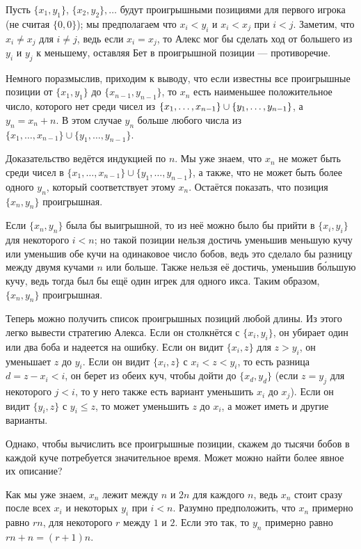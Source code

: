 Пусть $\{x_1 , y_1\}$, $\{x_2 , y_2\},\dots$ будут проигрышными позициями для первого игрока (не считая $\{0, 0\}$);
мы предполагаем что $x_i < y_i$ и $x_i < x_j$ при $i < j$.
Заметим, что $x_i \ne x_j$ для $i \ne j$, ведь если $x_i = x_j$, то Алекс мог бы сделать ход от большего из $y_i$ и $y_j$ к меньшему, оставляя Бет в проигрышной позиции --- противоречие.

Немного поразмыслив, приходим к выводу, что если известны все проигрышные позиции от $\{x_1 , y_1\}$ до $\{x_{n-1}, y_{n-1}\}$, то $x_n$ есть наименьшее положительное число, которого нет среди чисел из $\{x_1, \dots , x_{n-1}\} \z\cup \{y_1, \dots , y_{n-1}\}$, а $y_n = x_n + n$.
В этом случае $y_n$ больше любого числа из $\{x_1, \dots , x_{n-1}\} \cup \{y_1, \dots , y_{n-1}\}$.

Доказательство ведётся индукцией по $n$.
Мы уже знаем, что $x_n$ не может быть среди чисел в $\{x_1, \dots , x_{n-1}\} \cup \{y_1, \dots , y_{n-1}\}$, а также, что не может быть более одного $y_n$, который соответствует этому $x_n$.
Остаётся показать, что позиция $\{x_n, y_n\}$ проигрышная.

Если $\{x_n, y_n\}$ была бы выигрышной, то из неё можно было бы прийти в $\{x_i, y_i\}$ для некоторого $i < n$; но такой позиции нельзя достичь уменьшив меньшую кучу или уменьшив обе кучи на одинаковое число бобов, ведь это сделало бы разницу между двумя кучами $n$ или больше.
Также нельзя её достичь, уменьшив б\'{о}льшую кучу, ведь тогда был бы ещё один игрек для одного икса.
Таким образом, $\{x_n, y_n\}$ проигрышная.

Теперь можно получить список проигрышных позиций любой длины.
Из этого легко вывести стратегию Алекса.
Если он столкнётся с $\{x_i , y_i\}$, он убирает один или два боба и надеется на ошибку.
Если он видит $\{x_i , z\}$ для $z > y_i$, он уменьшает $z$ до $y_i$.
Если он видит $\{x_i , z\}$ с $x_i < z < y_i$, то есть разница $d = z - x_i < i$, он берет из обеих куч, чтобы дойти до $\{x_d , y_d\}$ (если $z = y_j$ для некоторого $j < i$, то у него также есть вариант уменьшить $x_i$ до $x_j$).
Если он видит $\{y_i , z\}$ с $y_i \le z$, то может уменьшить $z$ до $x_i$, а может иметь и другие варианты.


Однако, чтобы вычислить все проигрышные позиции, скажем до тысячи бобов в каждой куче потребуется значительное время.
Может можно найти более явное их описание?

Как мы уже знаем, $x_n$ лежит между $n$ и $2n$ для каждого $n$, ведь $x_n$ стоит сразу после всех $x_i$ и некоторых $y_i$ при $i < n$.
Разумно предположить, что $x_n$ примерно равно $rn$, для некоторого $r$ между $1$ и $2$.
Если это так, то $y_n$ примерно равно $rn + n = (r + 1)n$.

